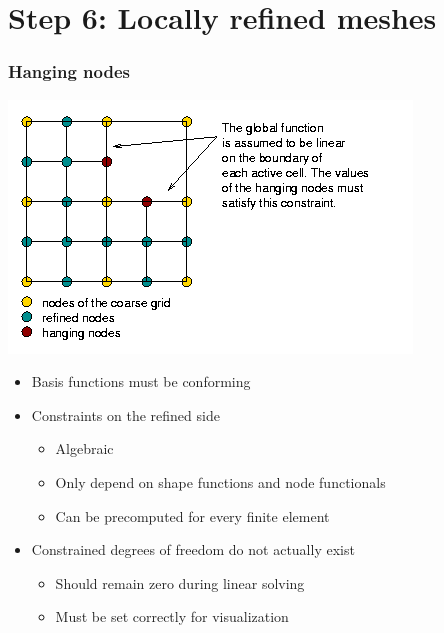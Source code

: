 \section[Step6]{Step 6: Locally refined meshes}



\begin{frame}
  \frametitle{Hanging nodes}
  \begin{center}
    \includegraphics[height=.5\textheight]{graph/hanging_nodes}    
  \end{center}
  \begin{itemize}
  \item Basis functions must be conforming
    \item Constraints on the refined side
    \begin{itemize}
      \item Algebraic
      \item Only depend on shape functions and node functionals
      \item Can be precomputed for every finite element
    \end{itemize}
  \item Constrained degrees of freedom do not actually exist
    \begin{itemize}
    \item Should remain zero during linear solving
    \item Must be set correctly for visualization
    \end{itemize}
  \end{itemize}
\end{frame}

